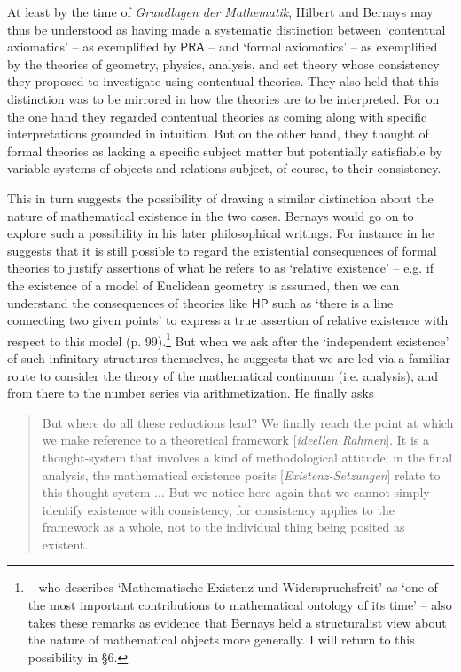 \documentclass[11pt,fleqn,leqno]{article}
\begin{document}
At least by the time of \textsl{Grundlagen der Mathematik},  Hilbert and Bernays may thus be understood as having made a systematic distinction between `contentual axiomatics' -- as exemplified by $\mathsf{PRA}$ -- and `formal axiomatics' -- as exemplified by the theories of geometry, physics, analysis, and set theory whose consistency they proposed to investigate using contentual theories.   They also held that this distinction was to be mirrored in how the theories are to be interpreted.   For on the one hand they regarded contentual theories as coming along with specific interpretations grounded in intuition.   But on the other hand, they thought of formal theories as lacking a specific subject matter but potentially satisfiable by variable systems of objects and relations subject, of course, to their consistency.  

This in turn suggests the possibility of drawing a similar distinction about the nature of mathematical existence in the two cases.  Bernays would go on to explore such a possibility in his later philosophical writings.  For instance in \citeyearpar{Bernays1950} he suggests that it is still possible to regard the existential consequences of formal theories to justify assertions of what he refers to as `relative existence' -- e.g. if the existence of a model of Euclidean geometry is assumed, then we can understand the consequences of theories like $\mathsf{HP}$ such as  `there is a line connecting two given points' to express a true assertion of relative existence with respect to this model (p. 99).\footnote{\citet{Parsons2014} -- who describes `Mathematische Existenz und Widerspruchsfreit' as `one of the most important contributions to mathematical ontology of its time' -- also takes these remarks as evidence that Bernays held a structuralist view about the nature of mathematical objects more generally.  I will return to this possibility in \S 6.}   But when we ask after the `independent existence' of such infinitary structures themselves, he suggests that we are led via a familiar route to consider the theory of the mathematical continuum (i.e. analysis), and from there to the number series via arithmetization.   He finally asks
\begin{quote}
\footnotesize{But where do all these reductions lead? We finally reach the point at which we make reference to a theoretical framework [\textsl{ideellen Rahmen}]. It is a thought-system that involves a kind of methodological attitude; in the final analysis, the mathematical existence posits [\textsl{Existenz-Setzungen}] relate to this thought system $\ldots$ But we notice here again that we cannot simply identify existence with consistency, for consistency applies to the framework as a whole, not to the individual thing being posited as existent.  \hspace*{1ex} \hfill \citeyearpar[p. 100]{Bernays1950}}
\end{quote}
\end{document}
